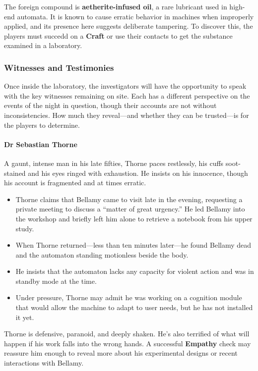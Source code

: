 The foreign compound is \textbf{aetherite-infused oil}, a rare lubricant used in high-end automata. It is known to cause erratic behavior in machines when improperly applied, and its presence here suggests deliberate tampering. To discover this, the players must succedd on a \textbf{Craft}  or use their contacts to get the substance examined in a laboratory.

\subsubsection*{Witnesses and Testimonies}
Once inside the laboratory, the investigators will have the opportunity to speak with the key witnesses remaining on site. Each has a different perspective on the events of the night in question, though their accounts are not without inconsistencies. How much they reveal—and whether they can be trusted—is for the players to determine.

\vspace{\baselineskip}
\paragraph{Dr Sebastian Thorne}
A gaunt, intense man in his late fifties, Thorne paces restlessly, his cuffs soot-stained and his eyes ringed with exhaustion. He insists on his innocence, though his account is fragmented and at times erratic.

\begin{itemize}
    \item Thorne claims that Bellamy came to visit late in the evening, requesting a private meeting to discuss a “matter of great urgency.” He led Bellamy into the workshop and briefly left him alone to retrieve a notebook from his upper study.
    \item When Thorne returned—less than ten minutes later—he found Bellamy dead and the automaton standing motionless beside the body.
    \item He insists that the automaton lacks any capacity for violent action and was in standby mode at the time.
    \item Under pressure, Thorne may admit he was working on a cognition module that would allow the machine to adapt to user needs, but he has not installed it yet.
\end{itemize}

Thorne is defensive, paranoid, and deeply shaken. He’s also terrified of what will happen if his work falls into the wrong hands. A successful \textbf{Empathy}  check may reassure him enough to reveal more about his experimental designs or recent interactions with Bellamy.



